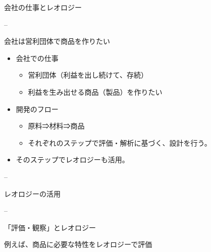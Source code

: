 \begin{frame}{会社の仕事とレオロジー}

--

\begin{block}{会社は営利団体で商品を作りたい}

\begin{itemize}

\item
  会社での仕事

  \begin{itemize}
  
  \item
    営利団体（利益を出し続けて、存続）
  \item
    利益を生み出せる商品（製品）を作りたい
  \end{itemize}
\item
  開発のフロー

  \begin{itemize}
  
  \item
    原料⇒材料⇒商品
  \item
    それぞれのステップで評価・解析に基づく、設計を行う。
  \end{itemize}
\item
  そのステップでレオロジーも活用。
\end{itemize}

--

\end{block}

\begin{block}{レオロジーの活用}

--

\end{block}

\begin{block}{「評価・観察」とレオロジー}

例えば、商品に必要な特性をレオロジーで評価

\end{block}

\end{frame}

